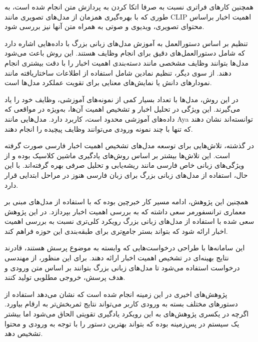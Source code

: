 همچنین کارهای فراتری نسبت به صرفا اتکا کردن به پردازش متن انجام شده است، به طوری که با بهره‌گیری همزمان از مدل‌های تصویری مانند CLIP اهمیت اخبار براساس محتوای تصویری، ویدیوی و صوتی به همراه متن آنها نیز بررسی شود.


تنظیم بر اساس دستورالعمل به آموزش مدل‌های زبانی بزرگ با داده‌هایی اشاره دارد که شامل دستورالعمل‌های دقیق برای انجام وظایف هستند.
این روش باعث می‌شود مدل‌ها بتوانند وظایف مشخصی مانند دسته‌بندی اهمیت اخبار را با دقت بیشتری انجام دهند. از سوی دیگر، تنظیم نمادین شامل استفاده از اطلاعات ساختاریافته مانند نمودارهای دانش یا نمایش‌های معنایی برای تقویت عملکرد مدل‌ها است.


در این روش، مدل‌ها با تعداد بسیار کمی از نمونه‌های آموزشی، وظایف خود را یاد می‌گیرند. این ویژگی در تحلیل اخبار و تشخیص اهمیت آن‌ها، به‌ویژه در مواقعی که داده‌های آموزشی محدود است، کاربرد دارد. مدل‌هایی مانند Aya توانسته‌اند نشان دهند که تنها با چند نمونه ورودی می‌توانند وظایف پیچیده را انجام دهند.


در گذشته، تلاش‌هایی برای توسعه مدل‌های تشخیص اهمیت اخبار فارسی صورت گرفته است. این تلاش‌ها بیشتر بر اساس روش‌های یادگیری ماشین کلاسیک بوده و از ویژگی‌های زبانی خاص فارسی مانند ریشه‌یابی و تحلیل صرفی بهره گرفته‌اند.
با این حال، استفاده از مدل‌های زبانی بزرگ برای زبان فارسی هنوز در مراحل ابتدایی قرار دارد.


همچنین این پژوهش، ادامه مسیر کار خبرچین
بوده که با استفاده‌ از مدل‌های مبنی بر معماری ترانسفورمر سعی داشته که به بررسی اهمیت اخبار بپردازد. در این پژوهش سعی شده با استفاده از مدل‌های زبانی بزرگ رویکرد کلی‌تری نسبت به بررسی اهمیت اخبار ارائه شود که بتواند بستر جامع‌‌تری برای طبقه‌بندی این حوزه فراهم کند.


این سامانه‌ها با طراحی درخواست‌هایی که وابسته به موضوع پرسش هستند، قادرند نتایج بهینه‌ای در تشخیص اهمیت اخبار ارائه دهند. برای این منظور، از مهندسی درخواست استفاده می‌شود تا مدل‌های زبانی بزرگ بتوانند بر اساس متن ورودی و هدف پرسش، خروجی مطلوبی تولید کنند.

پژوهش‌های اخیری در این زمینه انجام شده است که نشان می‌دهد استفاده از دستور‌های مختلف بسته به ورودی کاربر می‌تواند نتایج ثمربخش‌تر به ارقام بیاورد. اگرچه در یکسری پژوهش‌های به این رویکرد یادگیری تقویتی الحاق می‌شود
اما بیشتر یک سیستم در پس‌زمینه بوده که بتواند بهترین دستور را با توجه به ورودی و محتوا تشخیص دهد.